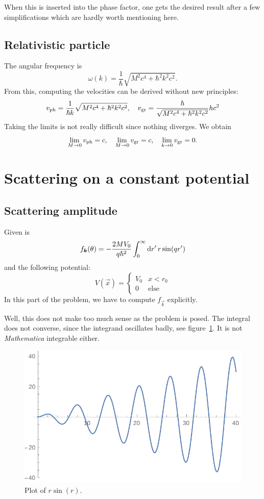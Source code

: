 \documentclass[11pt, english, fleqn, DIV=15, headinclude, BCOR=1.5cm]{scrartcl}
\begin{document}
When this is inserted into the phase factor, one gets the desired result after
a few simplifications which are hardly worth mentioning here.

\subsection{Relativistic particle}

The angular frequency is
\[
    \omega(k) = \frac{1}{\hbar} \sqrt{M^2 c^4 + \hbar^2 k^2 c^2}.
\]
From this, computing the velocities can be derived without new principles:
\[
    v_\text{ph} = \frac{1}{\hbar k} \sqrt{M^2 c^4 + \hbar^2 k^2 c^2}
    ,\quad
    v_\text{gr} = \frac{\hbar}{\sqrt{M^2 c^4 + \hbar^2 k^2 c^2}} h c^2
\]
Taking the limits is not really difficult since nothing diverges. We obtain
\[
    \lim_{M \to 0} v_\text{ph} = c
    ,\quad
    \lim_{M \to 0} v_\text{gr} = c
    ,\quad
    \lim_{k \to 0} v_\text{gr} = 0.
\]

\section{Scattering on a constant potential}

\subsection{Scattering amplitude}

Given is
\[
    f_{\boldsymbol{k}}(\theta) = - \frac{2MV_0}{q \hbar^2} \int_0^\infty \mathop{}\!\mathrm d r' \, r
    \sin(qr')
\]
and the following potential:
\[
    V(\vec x) =
    \begin{cases}
        V_0 & x < r_0 \\
        0 & \text{else}
    \end{cases}
\]
In this part of the problem, we have to compute $f_{\vec k}$ explicitly.

Well, this does not make too much sense as the problem is posed. The integral
does not converse, since the integrand oscillates badly, see
figure~\ref{fig:divergence}. It is not \emph{Mathematica} integrable either.

\begin{figure}[htbp]
    \centering
    \includegraphics[width=.7\linewidth]{divergence.pdf}
    \caption{%
        Plot of $r \sin(r)$.
    }
    \label{fig:divergence}
\end{figure}
\end{document}
